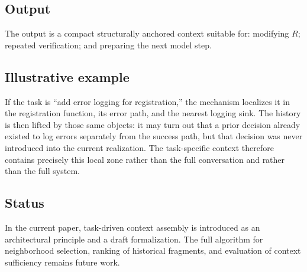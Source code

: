 \subsection{Output}

The output is a compact structurally anchored context suitable for: modifying $R$; repeated verification; and preparing the next model step.

\subsection{Illustrative example}

If the task is ``add error logging for registration,'' the mechanism localizes it in the registration function, its error path, and the nearest logging sink. The history is then lifted by those same objects: it may turn out that a prior decision already existed to log errors separately from the success path, but that decision was never introduced into the current realization. The task-specific context therefore contains precisely this local zone rather than the full conversation and rather than the full system.

\subsection{Status}

In the current paper, task-driven context assembly is introduced as an architectural principle and a draft formalization. The full algorithm for neighborhood selection, ranking of historical fragments, and evaluation of context sufficiency remains future work.
